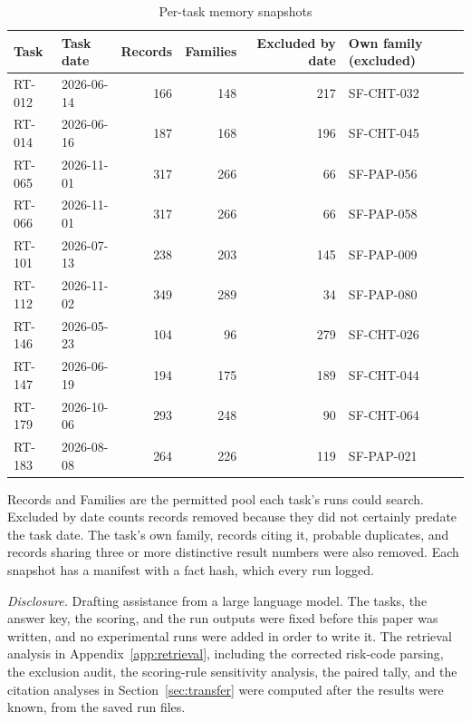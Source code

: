 \documentclass[11pt]{article}
\begin{document}
\begin{table}[ht]
\centering
\caption{Per-task memory snapshots}
\label{tab:snapshots}
\small
\begin{tabular}{llrrrl}
\toprule
Task & Task date & Records & Families & Excluded by date & Own family (excluded) \\
\midrule
RT-012 & 2026-06-14 & 166 & 148 & 217 & SF-CHT-032 \\
RT-014 & 2026-06-16 & 187 & 168 & 196 & SF-CHT-045 \\
RT-065 & 2026-11-01 & 317 & 266 & 66 & SF-PAP-056 \\
RT-066 & 2026-11-01 & 317 & 266 & 66 & SF-PAP-058 \\
RT-101 & 2026-07-13 & 238 & 203 & 145 & SF-PAP-009 \\
RT-112 & 2026-11-02 & 349 & 289 & 34 & SF-PAP-080 \\
RT-146 & 2026-05-23 & 104 & 96 & 279 & SF-CHT-026 \\
RT-147 & 2026-06-19 & 194 & 175 & 189 & SF-CHT-044 \\
RT-179 & 2026-10-06 & 293 & 248 & 90 & SF-CHT-064 \\
RT-183 & 2026-08-08 & 264 & 226 & 119 & SF-PAP-021 \\
\bottomrule
\end{tabular}

\vspace{0.4em}
\begin{minipage}{0.92\linewidth}\footnotesize
Records and Families are the permitted pool each task's runs could search. Excluded by date counts records removed because they did not certainly predate the task date. The task's own family, records citing it, probable duplicates, and records sharing three or more distinctive result numbers were also removed. Each snapshot has a manifest with a fact hash, which every run logged.
\end{minipage}
\end{table}

\vspace{1.5em}
\noindent\textit{Disclosure.} Drafting assistance from a large language model. The tasks, the answer key, the scoring, and the run outputs were fixed before this paper was written, and no experimental runs were added in order to write it. The retrieval analysis in Appendix~\ref{app:retrieval}, including the corrected risk-code parsing, the exclusion audit, the scoring-rule sensitivity analysis, the paired tally, and the citation analyses in Section~\ref{sec:transfer} were computed after the results were known, from the saved run files.
\end{document}

